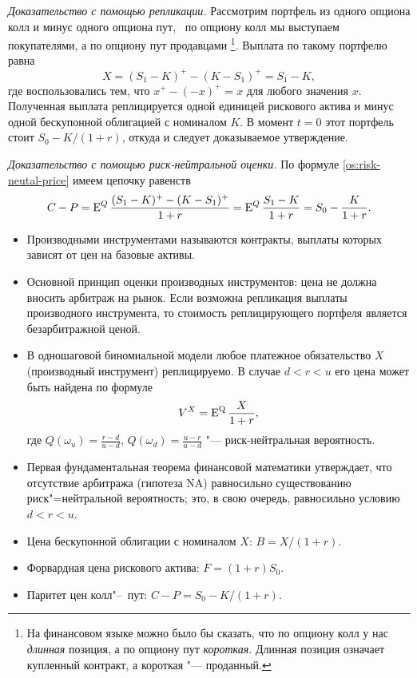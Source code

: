 \textit{Доказательство с помощью репликации.} Рассмотрим портфель из одного опциона колл и минус одного опциона пут, \te\ по опциону колл мы выступаем покупателями, а по опциону пут продавцами%
\footnote{На финансовом языке можно было бы сказать, что по опциону колл у нас \emph{длинная} позиция, а по опциону пут \emph{короткая}.
Длинная позиция означает купленный контракт, а короткая "--- проданный.}.
Выплата по такому портфелю равна
\[
X = (S_1 - K)^+ - (K-S_1)^+ = S_1 - K,
\]
где воспользовались тем, что $x^+ - (-x)^+ = x$ для любого значения $x$.
Полученная выплата реплицируется одной единицей рискового актива и минус одной бескупонной облигацией с номиналом $K$.
В момент $t=0$ этот портфель стоит $S_0 - K/(1+r)$, откуда и следует доказываемое утверждение.

\textit{Доказательство с помощью риск-нейтральной оценки.} По формуле \eqref{os:risk-neutal-price} имеем цепочку равенств
\begin{equation}
\label{os:parity-proof}
C - P = \operatorname{E}^Q \frac{(S_1-K)^+ - (K -S_1)^+ }{1+r}
= \operatorname{E}^Q \frac{S_1 - K}{1+r} = S_0 - \frac{K}{1+r}.
\end{equation}


\summary

\begin{itemize}
\item Производными инструментами называются контракты, выплаты которых зависят от цен на базовые активы.

\item Основной принцип оценки производных инструментов: цена не должна вносить арбитраж на рынок.
Если возможна репликация выплаты производного инструмента, то стоимость реплицирующего портфеля является безарбитражной ценой. 

\item В одношаговой биномиальной модели любое платежное обязательство $X$ (производный инструмент) реплицируемо.
В случае $d<r<u$ его цена может быть найдена по формуле
\[
V^X = \operatorname{E}^{\mathrm{Q}} \frac{X}{1+r},
\]
где $Q(\omega_u) = \frac{r-d}{u-d}$, $Q(\omega_d) = \frac{u-r}{u-d}$ "--- риск-нейтральная вероятность.

\item Первая фундаментальная теорема финансовой математики утверждает, что отсутствие арбитража (гипотеза NA) равносильно существованию риск"=нейтральной вероятность; это, в свою очередь, равносильно условию $d<r<u$.

\item Цена бескупонной облигации с номиналом $X$: $B = X/(1+r)$.

\item Форвардная цена рискового актива: $F=(1+r)S_0$.

\item Паритет цен колл"--~пут: $C-P = S_0 - K/(1+r)$.
\end{itemize}
